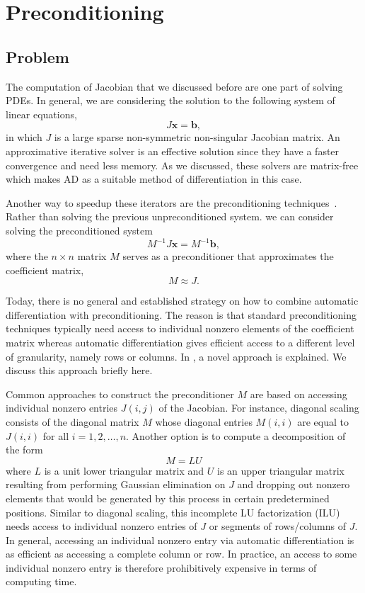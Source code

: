 \documentclass[12pt, oneside]{book}
\newcommand{\vek}[1]{{\ensuremath{\mathbf #1}}}
\begin{document}
\section{Preconditioning}
\label{s.precond}
\subsection{Problem}
The computation of Jacobian that we discussed before are one part of solving PDEs. 
In general, we are considering the solution to the following system of linear equations,
$$
J\vek{x} = \vek{b},
$$
in which $J$ is a large sparse non-symmetric non-singular Jacobian matrix. An approximative iterative solver is an
effective solution since they have a faster convergence and need less memory. As we discussed,
these solvers are matrix-free which makes AD as a suitable method of differentiation in this case.

Another way to speedup these iterators are 
the preconditioning techniques~\cite{precond1,precond2}.
Rather than solving the previous unpreconditioned system. 
we can consider solving the preconditioned system
\begin{equation}
\label{e:precond}
M^{-1} J \vek{x}= M^{-1}\vek{b},
\end{equation}
where the $n \times n$ matrix $M$ serves as a preconditioner that approximates
the coefficient matrix,
$$M \approx J.$$

Today, there is no general and established
strategy on how to combine automatic differentiation with preconditioning. The reason is
that standard preconditioning techniques typically need access to individual nonzero
elements of the coefficient matrix whereas automatic differentiation gives efficient
access to a different level of granularity, namely rows or columns.
In \cite{Lulfesmann2012Fap}, a novel approach is explained.
We discuss this approach briefly here.

Common approaches to construct the preconditioner $M$ are based on accessing individual
nonzero entries $J(i,j)$ of the Jacobian. For instance, diagonal scaling consists of the
diagonal matrix $M$ whose diagonal entries $M(i,i)$ are equal to $J(i,i)$ for all
$i=1,2,\dots, n$. Another option is to compute a decomposition of the form
$$M = LU$$
where $L$ is a unit lower triangular matrix and $U$ is an upper triangular matrix
resulting from performing Gaussian elimination on $J$ and dropping out nonzero elements
that would be generated by this process in certain predetermined positions. Similar to
diagonal scaling, this incomplete LU factorization (ILU) needs access to individual
nonzero entries of $J$ or segments of rows/columns of $J$. In general, accessing an
individual nonzero entry via automatic differentiation is as efficient as accessing a
complete column or row. In practice, an access to some individual nonzero entry is
therefore prohibitively expensive in terms of computing time.
\end{document}
